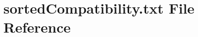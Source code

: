 \hypertarget{sortedCompatibility_8txt}{}\section{sorted\+Compatibility.\+txt File Reference}
\label{sortedCompatibility_8txt}
